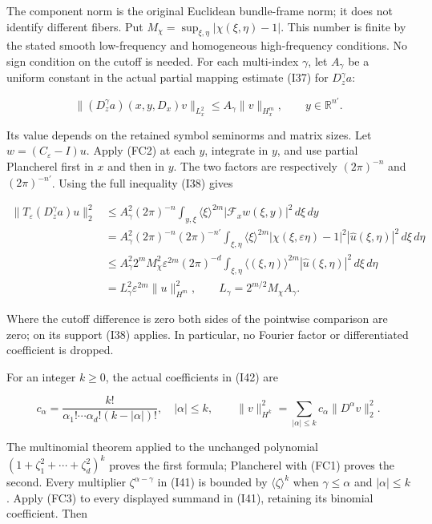 \documentclass[
  11pt,
]{article}
\begin{document}
The component norm is the original Euclidean bundle-frame norm; it does
not identify different fibers. Put
\(M_\chi=\sup_{\xi,\eta}|\chi(\xi,\eta)-1|\). This number is finite by
the stated smooth low-frequency and homogeneous high-frequency
conditions. No sign condition on the cutoff is needed. For each
multi-index \(\gamma\), let \(A_\gamma\) be a uniform constant in the
actual partial mapping estimate (I37) for \(D_z^\gamma a\):

\[
 \| (D_z^\gamma a)(x,y,D_x)v\|_{L^2_x}
        \leq A_\gamma\|v\|_{H^m_x},
 \qquad y\in\mathbb R^{n'}.
 \tag{FC2}
\]

Its value depends on the retained symbol seminorms and matrix sizes. Let
\(w=(C_\varepsilon-I)u\). Apply (FC2) at each \(y\), integrate in \(y\),
and use partial Plancherel first in \(x\) and then in \(y\). The two
factors are respectively \((2\pi)^{-n}\) and \((2\pi)^{-n'}\). Using the
full inequality (I38) gives

\[
 \begin{aligned}
 \|T_\varepsilon(D_z^\gamma a)u\|_2^2
 &\leq A_\gamma^2(2\pi)^{-n}
       \int_{y,\xi}\langle\xi\rangle^{2m}
                    |\mathcal F_x w(\xi,y)|^2\,d\xi\,dy\\
 &=A_\gamma^2(2\pi)^{-n}(2\pi)^{-n'}
       \int_{\xi,\eta}\langle\xi\rangle^{2m}
        |\chi(\xi,\varepsilon\eta)-1|^2
                     |\widehat u(\xi,\eta)|^2\,d\xi\,d\eta\\
 &\leq A_\gamma^2 2^m M_\chi^2\varepsilon^{2m}
      (2\pi)^{-d}\int_{\xi,\eta}
       \langle(\xi,\eta)\rangle^{2m}|\widehat u(\xi,\eta)|^2
                                                   \,d\xi\,d\eta\\
 &=L_\gamma^2\varepsilon^{2m}\|u\|_{H^m}^2,
 \qquad L_\gamma=2^{m/2}M_\chi A_\gamma.
 \end{aligned}
 \tag{FC3}
\]

Where the cutoff difference is zero both sides of the pointwise
comparison are zero; on its support (I38) applies. In particular, no
Fourier factor or differentiated coefficient is dropped.

For an integer \(k\geq0\), the actual coefficients in (I42) are

\[
 c_\alpha=\frac{k!}{\alpha_1!\cdots\alpha_d!(k-|\alpha|)!},
 \quad |\alpha|\leq k,\qquad
 \|v\|_{H^k}^2=\sum_{|\alpha|\leq k}c_\alpha\|D^\alpha v\|_2^2.
 \tag{FC4}
\]

The multinomial theorem applied to the unchanged polynomial
\((1+\zeta_1^2+\cdots+\zeta_d^2)^k\) proves the first formula;
Plancherel with (FC1) proves the second. Every multiplier
\(\zeta^{\alpha-\gamma}\) in (I41) is bounded by
\(\langle\zeta\rangle^k\) when \(\gamma\leq\alpha\) and
\(|\alpha|\leq k\). Apply (FC3) to every displayed summand in (I41),
retaining its binomial coefficient. Then
\end{document}
